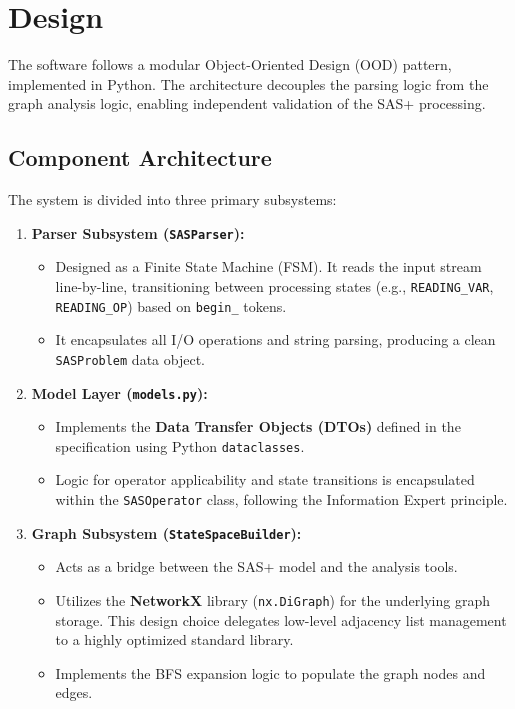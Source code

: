 \documentclass[12pt,a4paper]{report}
\begin{document}
\chapter{Design}
The software follows a modular Object-Oriented Design (OOD) pattern, implemented in Python. The architecture decouples the parsing logic from the graph analysis logic, enabling independent validation of the SAS+ processing.

\section{Component Architecture}
The system is divided into three primary subsystems:

\begin{enumerate}
    \item \textbf{Parser Subsystem (\texttt{SASParser}):}
    \begin{itemize}
        \item Designed as a Finite State Machine (FSM). It reads the input stream line-by-line, transitioning between processing states (e.g., \texttt{READING\_VAR}, \texttt{READING\_OP}) based on \texttt{begin\_} tokens.
        \item It encapsulates all I/O operations and string parsing, producing a clean \texttt{SASProblem} data object.
    \end{itemize}
    
    \item \textbf{Model Layer (\texttt{models.py}):}
    \begin{itemize}
        \item Implements the \textbf{Data Transfer Objects (DTOs)} defined in the specification using Python \texttt{dataclasses}.
        \item Logic for operator applicability and state transitions is encapsulated within the \texttt{SASOperator} class, following the Information Expert principle.
    \end{itemize}
    
    \item \textbf{Graph Subsystem (\texttt{StateSpaceBuilder}):}
    \begin{itemize}
        \item Acts as a bridge between the SAS+ model and the analysis tools.
        \item Utilizes the \textbf{NetworkX} library (\texttt{nx.DiGraph}) for the underlying graph storage. This design choice delegates low-level adjacency list management to a highly optimized standard library.
        \item Implements the BFS expansion logic to populate the graph nodes and edges.
    \end{itemize}
\end{enumerate}
\end{document}
